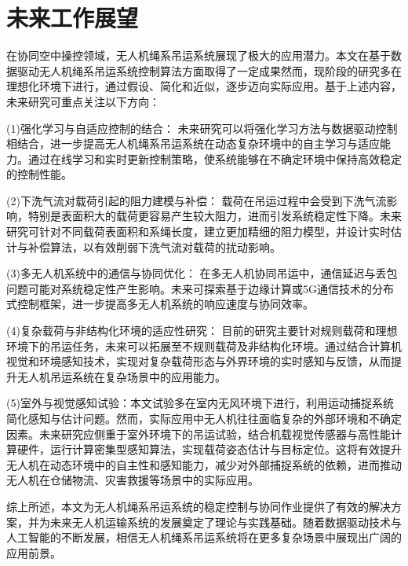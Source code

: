 \documentclass[lang=chs, degree=master, blindreview=true, winfonts=true]{yanputhesis}
\begin{document}
\section{未来工作展望}
在协同空中操控领域，无人机绳系吊运系统展现了极大的应用潜力。本文在基于数据驱动无人机绳系吊运系统控制算法方面取得了一定成果然而，现阶段的研究多在理想化环境下进行，通过假设、简化和近似，逐步迈向实际应用。基于上述内容，未来研究可重点关注以下方向：

(1)强化学习与自适应控制的结合：
未来研究可以将强化学习方法与数据驱动控制相结合，进一步提高无人机绳系吊运系统在动态复杂环境中的自主学习与适应能力。通过在线学习和实时更新控制策略，使系统能够在不确定环境中保持高效稳定的控制性能。

(2)下洗气流对载荷引起的阻力建模与补偿：
载荷在吊运过程中会受到下洗气流影响，特别是表面积大的载荷更容易产生较大阻力，进而引发系统稳定性下降。未来研究可针对不同载荷表面积和系绳长度，建立更加精细的阻力模型，并设计实时估计与补偿算法，以有效削弱下洗气流对载荷的扰动影响。

(3)多无人机系统中的通信与协同优化：
在多无人机协同吊运中，通信延迟与丢包问题可能对系统稳定性产生影响。未来可探索基于边缘计算或5G通信技术的分布式控制框架，进一步提高多无人机系统的响应速度与协同效率。

(4)复杂载荷与非结构化环境的适应性研究：
目前的研究主要针对规则载荷和理想环境下的吊运任务，未来可以拓展至不规则载荷及非结构化环境。通过结合计算机视觉和环境感知技术，实现对复杂载荷形态与外界环境的实时感知与反馈，从而提升无人机吊运系统在复杂场景中的应用能力。

(5)室外与视觉感知试验：本文试验多在室内无风环境下进行，利用运动捕捉系统简化感知与估计问题。然而，实际应用中无人机往往面临复杂的外部环境和不确定因素。未来研究应侧重于室外环境下的吊运试验，结合机载视觉传感器与高性能计算硬件，运行计算密集型感知算法，实现载荷姿态估计与目标定位。这将有效提升无人机在动态环境中的自主性和感知能力，减少对外部捕捉系统的依赖，进而推动无人机在仓储物流、灾害救援等场景中的实际应用。

综上所述，本文为无人机绳系吊运系统的稳定控制与协同作业提供了有效的解决方案，并为未来无人机运输系统的发展奠定了理论与实践基础。随着数据驱动技术与人工智能的不断发展，相信无人机绳系吊运系统将在更多复杂场景中展现出广阔的应用前景。





\backmatter                                                 %
%
\end{document}
